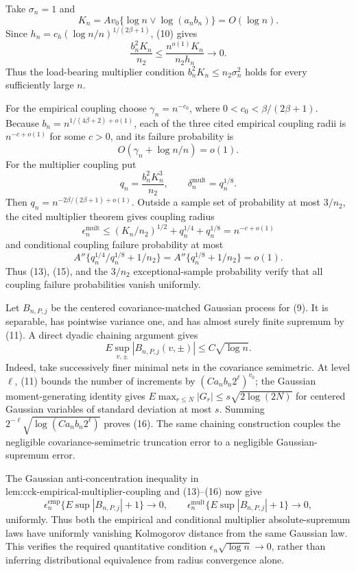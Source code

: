 Take \(\sigma_n=1\) and
\[
 K_n=Av_0\{\log n\vee\log(a_nb_n)\}=O(\log n).
\]
Since \(h_n=c_h(\log n/n)^{1/(2\beta+1)}\), (10) gives
\[
 \frac{b_n^2K_n}{n_2}
 \le\frac{n^{o(1)}K_n}{n_2h_n}\longrightarrow0. \tag{12}
\]
Thus the load-bearing multiplier condition \(b_n^2K_n\le n_2\sigma_n^2\) holds for every sufficiently large \(n\).

For the empirical coupling choose \(\gamma_n=n^{-c_0}\), where \(0<c_0<\beta/(2\beta+1)\). Because \(b_n=n^{1/(4\beta+2)+o(1)}\), each of the three cited empirical coupling radii is \(n^{-c+o(1)}\) for some \(c>0\), and its failure probability is
\[
 O(\gamma_n+\log n/n)=o(1). \tag{13}
\]
For the multiplier coupling put
\[
 q_n=\frac{b_n^2K_n^3}{n_2},
 \qquad \delta_n^{\mathrm{mult}}=q_n^{1/8}.
\]
Then \(q_n=n^{-2\beta/(2\beta+1)+o(1)}\). Outside a sample set of probability at most \(3/n_2\), the cited multiplier theorem gives coupling radius
\[
 \epsilon_n^{\mathrm{mult}}
 \le (K_n/n_2)^{1/2}+q_n^{1/4}+q_n^{1/8}
 =n^{-c+o(1)} \tag{14}
\]
and conditional coupling failure probability at most
\[
 A''\{q_n^{1/4}/q_n^{1/8}+1/n_2\}
 =A''\{q_n^{1/8}+1/n_2\}=o(1). \tag{15}
\]
Thus (13), (15), and the \(3/n_2\) exceptional-sample probability verify that all coupling failure probabilities vanish uniformly.

Let \(B_{n,P,j}\) be the centered covariance-matched Gaussian process for (9). It is separable, has pointwise variance one, and has almost surely finite supremum by (11). A direct dyadic chaining argument gives
\[
 E\sup_{v,\pm}|B_{n,P,j}(v,\pm)|\le C\sqrt{\log n}. \tag{16}
\]
Indeed, take successively finer minimal nets in the covariance semimetric. At level \(\ell\), (11) bounds the number of increments by \((Ca_nb_n2^\ell)^{v_0}\); the Gaussian moment-generating identity gives \(E\max_{r\le N}|G_r|\le s\sqrt{2\log(2N)}\) for centered Gaussian variables of standard deviation at most \(s\). Summing \(2^{-\ell}\sqrt{\log(Ca_nb_n2^\ell)}\) proves (16). The same chaining construction couples the negligible covariance-semimetric truncation error to a negligible Gaussian-supremum error.

The Gaussian anti-concentration inequality in \(\text{lem:cck-empirical-multiplier-coupling}\) and (13)--(16) now give
\[
 \epsilon_n^{\mathrm{emp}}\{E\sup|B_{n,P,j}|+1\}\to0,
 \qquad
 \epsilon_n^{\mathrm{mult}}\{E\sup|B_{n,P,j}|+1\}\to0, \tag{17}
\]
uniformly. Thus both the empirical and conditional multiplier absolute-supremum laws have uniformly vanishing Kolmogorov distance from the same Gaussian law. This verifies the required quantitative condition \(\epsilon_n\sqrt{\log n}\to0\), rather than inferring distributional equivalence from radius convergence alone.

